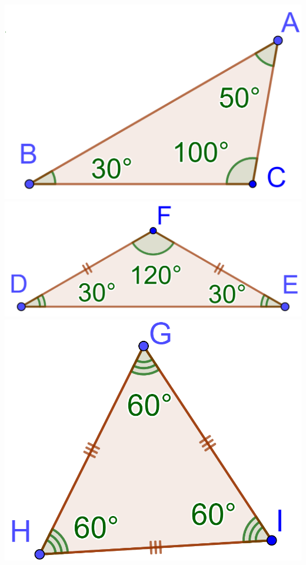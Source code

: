 \documentclass[12pt,a4paper]{article}
\begin{document}
\begin{myexs}
\begin{multicols}{2}
		\begin{center}	
			\includegraphics[scale=0.18]{quelconque}	
			\includegraphics[scale=0.18]{isocele}	
			\includegraphics[scale=0.18]{equilateral}
		\end{center}
	\end{multicols}
\end{myexs}
\end{document}
